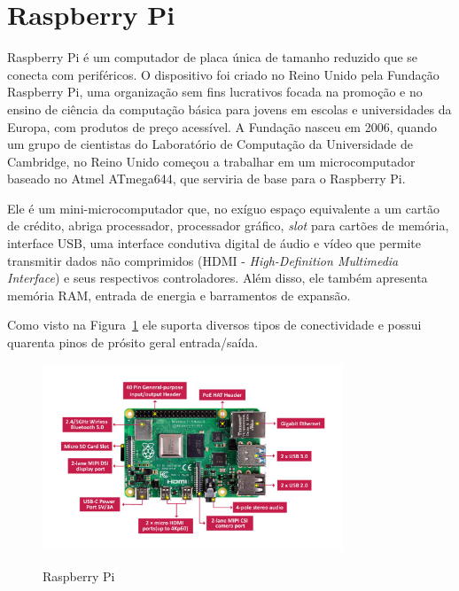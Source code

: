 \section{Raspberry Pi}
\label{sec:raspberrypi}

Raspberry Pi é um computador de placa única de tamanho reduzido que se conecta com periféricos. O dispositivo foi criado no Reino Unido pela Fundação Raspberry Pi, uma organização sem fins lucrativos focada na promoção e no ensino de ciência da computação básica para jovens em escolas e universidades da Europa, com produtos de preço acessível. A Fundação nasceu em 2006, quando um grupo de cientistas do Laboratório de Computação da Universidade de Cambridge, no Reino Unido começou a trabalhar em um microcomputador baseado no Atmel ATmega644, que serviria de base para o Raspberry Pi.

Ele é um mini-microcomputador que, no exíguo espaço equivalente a um cartão de crédito, abriga processador, processador gráfico, \textit{slot} para cartões de memória, interface USB, uma interface condutiva digital de áudio e vídeo que permite transmitir dados não comprimidos (HDMI - \textit{High-Definition Multimedia Interface}) e  seus respectivos controladores. Além disso, ele também apresenta memória RAM, entrada de energia e barramentos de expansão.

Como visto na Figura~\ref{fig:RaspberryPi-CAM} ele suporta diversos tipos de conectividade e possui quarenta pinos de prósito geral entrada/saída.

\begin{figure}[!hbtp]
  \centering
   \caption{Raspberry Pi}
    \includegraphics[width = 0.8\textwidth]{Caps/Figs/mat-met/raspberryPI.jpg}
   \label{fig:RaspberryPi-CAM}
\end{figure}

